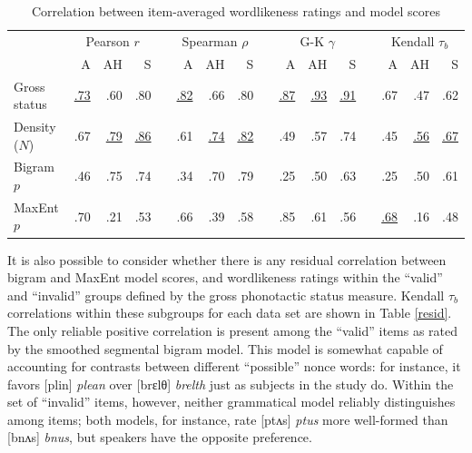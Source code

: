 \begin{table}[t]
\centering
\begin{tabular}{l rrr c rrr c rrr c rrr}
\toprule
              &         \multicolumn{3}{c}{Pearson $r$} &&     \multicolumn{3}{c}{Spearman $\rho$} && \multicolumn{3}{c}{G-K $\gamma$} && \multicolumn{3}{c}{Kendall $\tau_b$} \\
\cmidrule{2-4} \cmidrule{6-8} \cmidrule{10-12} \cmidrule{14-16}
              &           A &         AH &            S &&           A &       AH    &           S &&           A &          AH &           S &&           A &          AH & S \\
\midrule
Gross status & \uline{.73} &       {.60} &       {.80} && \uline{.82} &       {.66} &       {.80} && \uline{.87} & \uline{.93} & \uline{.91} &&       {.67} &       {.47} &       {.62} \\
Density ($N$) &       {.67} & \uline{.79} & \uline{.86} &&       {.61} & \uline{.74} & \uline{.82} &&       {.49} &       {.57} &       {.74} &&       {.45} & \uline{.56} & \uline{.67} \\
Bigram $p$ &       {.46} &       {.75} &       {.74} &&       {.34} &       {.70} &       {.79} &&       {.25} &       {.50} &       {.63} &&       {.25} &       {.50} &       {.61} \\
MaxEnt $p$ &       {.70} &       {.21} &       {.53} &&       {.66} &       {.39} &       {.58} &&       {.85} &       {.61} &       {.56} && \uline{.68} &       {.16} &       {.48} \\ 
\bottomrule
\end{tabular}
\caption{Correlation between item-averaged wordlikeness ratings and model scores}
\label{scores}
\end{table}

It is also possible to consider whether there is any residual correlation between bigram and MaxEnt model scores, and wordlikeness ratings within the ``valid'' and ``invalid'' groups defined by the gross phonotactic status measure. Kendall $\tau_{b}$ correlations within these subgroups for each data set are shown in Table \ref{resid}. The only reliable positive correlation is present among the ``valid'' items as rated by the smoothed segmental bigram model. This model is somewhat capable of accounting for contrasts between different ``possible'' nonce words: for instance, it favors [plin] \emph{plean} over [brɛlθ] \emph{brelth} just as subjects in the \citet{Albright2007} study do. Within the set of ``invalid'' items, however, neither grammatical model reliably distinguishes among items; both models, for instance, rate [ptʌs] \emph{ptus} more well-formed than [bnʌs] \emph{bnus}, but speakers have the opposite preference. 

